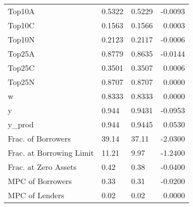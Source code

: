 \begin{table}
\begin{tabular}{lllr}
                  Top10A &  0.5322 &   0.5229 & -0.0093 \\
                  Top10C &  0.1563 &   0.1566 &  0.0003 \\
                  Top10N &  0.2123 &   0.2117 & -0.0006 \\
                  Top25A &  0.8779 &   0.8635 & -0.0144 \\
                  Top25C &  0.3501 &   0.3507 &  0.0006 \\
                  Top25N &  0.8707 &   0.8707 &  0.0000 \\
                       w &  0.8333 &   0.8333 &  0.0000 \\
                       y &   0.944 &   0.9431 & -0.0953 \\
                  y\_prod &   0.944 &   0.9445 &  0.0530 \\
      Frac. of Borrowers &   39.14 &    37.11 & -2.0300 \\
Frac. at Borrowing Limit &   11.21 &     9.97 & -1.2400 \\
    Frac. at Zero Assets &    0.42 &     0.38 & -0.0400 \\
        MPC of Borrowers &    0.33 &     0.31 & -0.0200 \\
          MPC of Lenders &    0.02 &     0.02 &  0.0000 \\
\bottomrule
\end{tabular}
\end{table}
